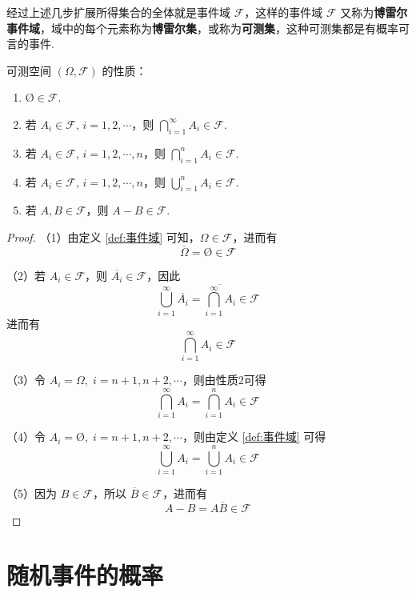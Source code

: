 经过上述几步扩展所得集合的全体就是事件域 $\mathcal{F}$，这样的事件域 $\mathcal{F}$ 又称为\textbf{博雷尔事件域}，域中的每个元素称为\textbf{博雷尔集}，或称为\textbf{可测集}，这种可测集都是有概率可言的事件.

\begin{property}
    \indent 可测空间 $(\varOmega, \mathcal{F})$ 的性质：
    \begin{enumerate}
        \item $\text{\O} \in \mathcal{F}$.
        \item 若 $A_i \in \mathcal{F}, \, i=1,2,\cdots$，则 $\displaystyle\bigcap_{i=1}^{\infty} A_i \in \mathcal{F}$.
        \item 若 $A_i \in \mathcal{F}, \, i=1,2,\cdots,n$，则 $\displaystyle\bigcap_{i=1}^n A_i \in \mathcal{F}$.
        \item 若 $A_i \in \mathcal{F}, \, i=1,2,\cdots,n$，则 $\displaystyle\bigcup_{i=1}^n A_i \in \mathcal{F}$.
        \item 若 $A,B \in \mathcal{F}$，则 $A-B \in \mathcal{F}$.
    \end{enumerate}
\end{property}

\begin{proof}
    （1）由定义 \ref{def:事件域} 可知，$\varOmega \in \mathcal{F}$，进而有
    $$
    \overline{\varOmega} = \text{\O} \in \mathcal{F}
    $$

    （2）若 $A_i \in \mathcal{F}$，则 $\overline{A_i} \in \mathcal{F}$，因此
    $$
    \bigcup_{i=1}^{\infty} \overline{A_i} = \overline{\bigcap_{i=1}^{\infty} A_i} \in \mathcal{F}
    $$
    进而有
    $$
    \bigcap_{i=1}^{\infty} A_i \in \mathcal{F}
    $$

    （3）令 $A_{i} = \varOmega,\; i = n+1, n+2, \cdots$，则由性质2可得
    $$
    \bigcap_{i=1}^{\infty} A_i = \bigcap_{i=1}^{n} A_i \in \mathcal{F}
    $$

    （4）令 $A_{i} = \text{\O},\; i = n+1, n+2, \cdots$，则由定义 \ref{def:事件域} 可得
    $$
    \bigcup_{i=1}^{\infty} A_i = \bigcup_{i=1}^{n} A_i \in \mathcal{F}
    $$

    （5）因为 $B \in \mathcal{F}$，所以 $\overline{B} \in \mathcal{F}$，进而有
    $$
    A-B = A \overline{B} \in \mathcal{F}
    $$
\end{proof}

\section{随机事件的概率}

